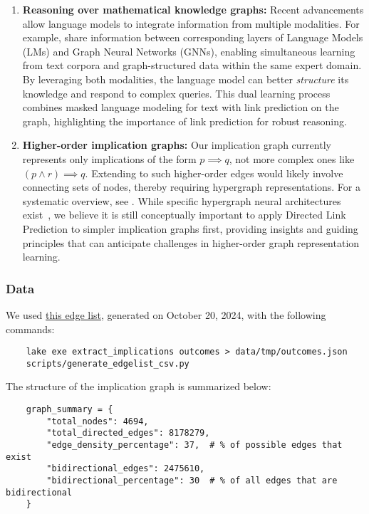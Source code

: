 \begin{enumerate}
    \item \textbf{Reasoning over mathematical knowledge graphs:} Recent advancements allow language
    models to integrate information from multiple modalities. For example,
    \cite{Zhang2022, Yasunaga2022} share information between corresponding layers of Language Models (LMs)
    and Graph Neural Networks (GNNs), enabling simultaneous learning from text corpora and graph-structured
    data within the same expert domain. By leveraging both modalities, the language model can better
    \emph{structure} its knowledge and respond to complex queries. This dual learning process combines
    masked language modeling for text with link prediction on the graph, highlighting the importance
    of link prediction for robust reasoning.
    \item \textbf{Higher-order implication graphs:} Our implication graph currently represents only
    implications of the form $p \implies q$, not more complex ones like $(p \land r) \implies q$.
    Extending to such higher-order edges would likely involve connecting sets of nodes, thereby
    requiring hypergraph representations. For a systematic overview, see \cite{Kivela2014}.
    While specific hypergraph neural architectures exist~\cite{Feng2019}, we believe it is still
    conceptually important to apply Directed Link Prediction to simpler implication graphs first,
    providing insights and guiding principles that can anticipate challenges in higher-order graph
    representation learning.
\end{enumerate}

\subsubsection{Data}

We used \href{https://github.com/teorth/equational_theories/blob/main/data/2024-10-20-edge_list.csv.zip}{this edge list},
generated on October 20, 2024, with the following commands:

\begin{verbatim}
    lake exe extract_implications outcomes > data/tmp/outcomes.json
    scripts/generate_edgelist_csv.py
\end{verbatim}

The structure of the implication graph is summarized below:

\begin{verbatim}
    graph_summary = {
        "total_nodes": 4694,
        "total_directed_edges": 8178279,
        "edge_density_percentage": 37,  # % of possible edges that exist
        "bidirectional_edges": 2475610,
        "bidirectional_percentage": 30  # % of all edges that are bidirectional
    }
\end{verbatim}

